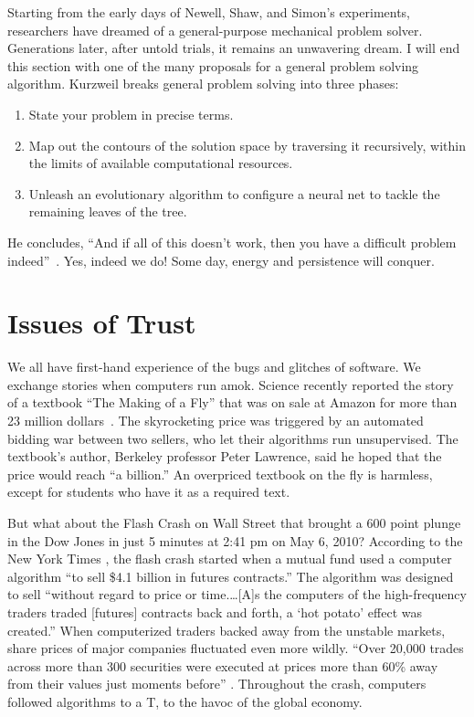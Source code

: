 \documentclass{llncs}
\begin{document}

\bigskip

Starting from the early days of Newell, Shaw, and Simon's experiments,
researchers have dreamed of a general-purpose mechanical problem
solver.  Generations later, after untold trials, it remains an
unwavering dream.  I will end this section with one of the many
proposals for a general problem solving algorithm.  Kurzweil breaks
general problem solving into three phases:
\begin{enumerate} 
\item State your problem in precise terms.
\item Map out the contours of the solution space by traversing it
  recursively, within the limits of available computational resources.
\item Unleash an evolutionary algorithm to configure a neural net to
  tackle the remaining leaves of the tree.
\end{enumerate}
He concludes, ``And if all of this doesn't work, then you have a
difficult problem indeed''~\cite{Ku99}.  Yes, indeed we do!  Some day,
energy and persistence will conquer.



\newpage
\section{Issues of Trust}\label{sec:trust}

We all have first-hand experience of the bugs and glitches of
software.  We exchange stories when computers run amok.  Science
recently reported the story of a textbook ``The Making of a Fly'' that
was on sale at Amazon for more than 23 million dollars~\cite{Sci11}.
The skyrocketing price was triggered by an automated bidding war
between two sellers, who let their algorithms run unsupervised.  The
textbook's author, Berkeley professor Peter Lawrence, said he hoped
that the price would reach ``a billion.''
An overpriced textbook on the fly is harmless, except for students who
have it as a required text.  

But what about the Flash Crash on Wall
Street that brought a 600 point plunge in the Dow Jones in just 5
minutes at 2:41 pm on May 6, 2010?  According to the New York Times
\cite{NYT2010}, the flash crash started when a mutual fund used a
computer algorithm ``to sell \$4.1 billion in futures contracts.''
The algorithm was designed to sell ``without regard to price or
time.\dots [A]s the computers of the high-frequency traders traded
[futures] contracts back and forth, a `hot potato' effect was
created.''  When computerized traders backed away from the unstable
markets, share prices of major companies fluctuated even more
wildly. ``Over 20,000 trades across more than 300 securities were
executed at prices more than 60\% away from their values just moments
before'' \cite{SEC2010}. Throughout the crash, computers followed
algorithms to a T, to the havoc of the global economy.
\end{document}

